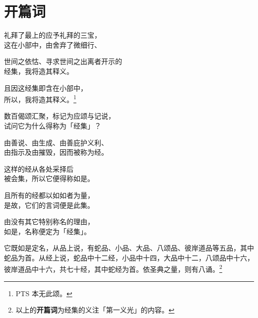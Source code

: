 \section{开篇词}

\vspace{\fill}

\begin{quoting}礼拜了最上的应予礼拜的三宝，\\这在小部中，由舍弃了微细行、\end{quoting}

\begin{quoting}世间之依怙、寻求世间之出离者开示的\\经集，我将造其释义。\end{quoting}

\begin{quoting}且因这经集即含在小部中，\\所以，我将造其释义。\footnote{PTS 本无此颂。}\end{quoting}

\begin{quoting}数百偈颂汇聚，标记为应颂与记说，\\试问它为什么得称为「经集」？\end{quoting}

\begin{quoting}由善说、由生成、由善庇护义利、\\由指示及由摧毁，因而被称为经。\end{quoting}

\begin{quoting}这样的经从各处采择后\\被会集，所以它便得称如是。\end{quoting}

\begin{quoting}且所有的经都以如如者为量，\\是故，它们的言词便是此集。\end{quoting}

\begin{quoting}由没有其它特别称名的理由，\\如是，名称便定为「经集」。\end{quoting}

它既如是定名，从品上说，有蛇品、小品、大品、八颂品、彼岸道品等五品，其中蛇品为首。从经上说，蛇品中十二经，小品中十四，大品中十二，八颂品中十六，彼岸道品中十六，共七十经，其中蛇经为首。依圣典之量，则有八诵。\footnote{以上的\textbf{开篇词}为经集的义注「第一义光」的内容。}

\vspace{7em}